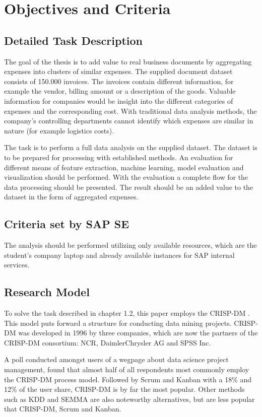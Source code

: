 \chapter{Objectives and Criteria}
\section{Detailed Task Description}
The goal of the thesis is to add value to real business documents by aggregating expenses into clusters of similar expenses. The supplied document dataset consists of 150.000 invoices. The invoices contain different information, for example the vendor, billing amount or a description of the goods. Valuable information for companies would be insight into the different categories of expenses and the corresponding cost. With traditional data analysis methods, the company’s controlling departments cannot identify which expenses are similar in nature (for example logistics costs). 

The task is to perform a full data analysis on the supplied dataset. The dataset is to be prepared for processing with established methods. An evaluation for different means of feature extraction, machine learning, model evaluation and visualization should be performed. With the evaluation a complete flow for the data processing should be presented. The result should be an added value to the dataset in the form of aggregated expenses.

\section{Criteria set by SAP SE}
The analysis should be performed utilizing only available resources, which are the student’s company laptop and already available instances for SAP internal services.

\section{Research Model}

To solve the task described in chapter 1.2, this paper employs the \ac{CRISP-DM} \cite{CRISPDM2000}. This model puts forward a structure for conducting data mining projects. \ac{CRISP-DM} was developed in 1996 by three companies, which are now the partners of the \ac{CRISP-DM} consortium: NCR, DaimlerChrysler AG and SPSS Inc. 

A poll \cite{CRISPDMPopular2020} conducted amongst users of a wegpage about data science project management, found that almost half of all respondents most commonly employ the \ac{CRISP-DM} process model. Followed by Scrum and Kanban with a 18\% and 12\% of the user share, \ac{CRISP-DM} is by far the most popular. Other methods such as \ac{KDD} and \ac{SEMMA} are also noteworthy alternatives, but are less popular that CRISP-DM, Scrum and Kanban.

